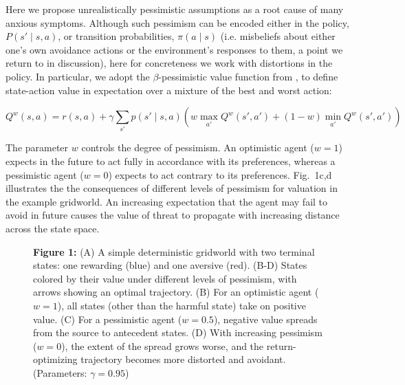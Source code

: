 \documentclass[11pt]{article} %
\begin{document}
Here we propose unrealistically pessimistic assumptions as a root cause of many anxious symptoms. Although such pessimism can be encoded either in the policy, $P(s' \mid s,a)$, or transition probabilities, $\pi(a \mid s)$ (i.e. misbeliefs about either one's own avoidance actions or the environment's responses to them, a point we return to in discussion), here for concreteness we work with distortions in the policy. In particular, we adopt the $\beta$-pessimistic value function from \cite{Gaskett2003}, to define state-action value in expectation over a mixture of the best and worst action:

\begin{equation}\label{eq:pessimism}
Q^w(s,a) = r(s,a) + \gamma \sum_{s'} p(s' \mid s,a) \left( w \max_{a'} Q^w(s',a') + (1 - w) \min_{a'} Q^w(s',a') \right)
\end{equation}

The parameter $w$ controls the degree of pessimism. An optimistic agent ($w = 1$) expects in the future to act fully in accordance with its preferences, whereas a pessimistic agent ($w = 0$) expects to act contrary to its preferences. Fig.~1c,d illustrates the the consequences of different levels of pessimism for valuation in the example gridworld. An increasing expectation that the agent may fail to avoid in future causes the value of threat to propagate with increasing distance across the state space.

\begin{figure}
  \centerline{%
  }
  \par \textbf{Figure 1:} (A) A simple deterministic gridworld with two terminal states: one rewarding (blue) and one aversive (red). (B-D) States colored by their value under different levels of pessimism, with arrows showing an optimal trajectory. (B) For an optimistic agent ($w=1$), all states (other than the harmful state) take on positive value. (C) For a pessimistic agent ($w=0.5$), negative value spreads from the source to antecedent states. (D) With increasing pessimism ($w=0$), the extent of the spread grows worse, and the return-optimizing trajectory becomes more distorted and avoidant. (Parameters: $\gamma = 0.95$)
\end{figure}
\end{document}
